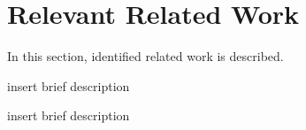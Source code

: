 \section{Relevant Related Work}
In this section, identified related work is described.



\cite{vad-r1} insert brief description

\cite{ucf-crime} insert brief description